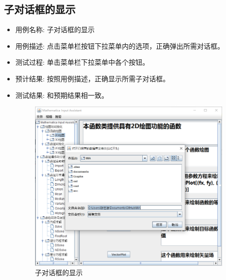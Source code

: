 \documentclass[hyperref, UTF8
,bookmarksnumbered=true, oneside]{ctexbook}
\begin{document}
		
	

		\subsection{子对话框的显示} %
		\begin{itemize}
			\item 用例名称: 子对话框的显示
			\item 用例描述: 点击菜单栏按钮下拉菜单内的选项，正确弹出所需对话框。
			\item 测试过程: 单击菜单栏下拉菜单中各个按钮。
			\item 预计结果: 按照用例描述，正确显示所需子对话框。
			\item 测试结果:	和预期结果相一致。

				\begin{figure}[!h]
                	\centering
                	\includegraphics[width=4in]{4.png}
                	\caption{子对话框的显示}    
                	\label{pic:MathObject}
            	\end{figure}

		\end{itemize}
	
	
\end{document}
